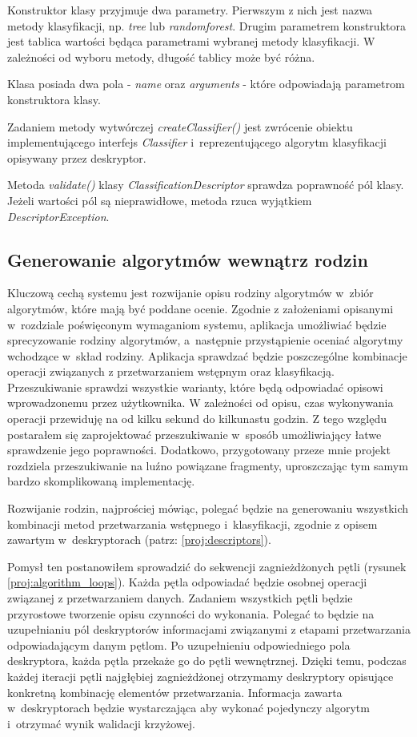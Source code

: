\documentclass[../thesis.tex]{subfiles}
\begin{document}
Konstruktor klasy przyjmuje dwa parametry. Pierwszym z nich jest nazwa metody klasyfikacji, np. \emph{tree} lub \emph{randomforest}. Drugim parametrem konstruktora jest tablica wartości będąca parametrami wybranej metody klasyfikacji. W zależności od wyboru metody, długość tablicy może być różna.

Klasa posiada dwa pola - \emph{name} oraz \emph{arguments} - które odpowiadają parametrom konstruktora klasy.

Zadaniem metody wytwórczej \emph{createClassifier()} jest zwrócenie obiektu implementującego interfejs \emph{Classifier} i~reprezentującego algorytm klasyfikacji opisywany przez deskryptor.

Metoda \emph{validate()} klasy \emph{ClassificationDescriptor} sprawdza poprawność pól klasy. Jeżeli wartości pól są nieprawidłowe, metoda rzuca wyjątkiem \emph{DescriptorException}.

\subsection{Generowanie algorytmów wewnątrz rodzin}

Kluczową cechą systemu jest rozwijanie opisu rodziny algorytmów w~zbiór algorytmów, które mają być poddane ocenie. Zgodnie z założeniami opisanymi w~rozdziale poświęconym wymaganiom systemu, aplikacja umożliwiać będzie sprecyzowanie rodziny algorytmów, a~następnie przystąpienie oceniać algorytmy wchodzące w~skład rodziny. Aplikacja sprawdzać będzie poszczególne kombinacje operacji związanych z przetwarzaniem wstępnym oraz klasyfikacją. Przeszukiwanie sprawdzi wszystkie warianty, które będą odpowiadać opisowi wprowadzonemu przez użytkownika. W zależności od opisu, czas wykonywania operacji przewiduję na od kilku sekund do kilkunastu godzin. Z tego względu postarałem się zaprojektować przeszukiwanie w~sposób umożliwiający łatwe sprawdzenie jego poprawności. Dodatkowo, przygotowany przeze mnie projekt rozdziela przeszukiwanie na luźno powiązane fragmenty, uproszczając tym samym bardzo skomplikowaną implementację.

Rozwijanie rodzin, najprościej mówiąc, polegać będzie na generowaniu wszystkich kombinacji metod przetwarzania wstępnego i~klasyfikacji, zgodnie z opisem zawartym w~deskryptorach (patrz: \ref{proj:descriptors}).

Pomysł ten postanowiłem sprowadzić do sekwencji zagnieżdżonych pętli (rysunek \ref{proj:algorithm_loops}). Każda pętla odpowiadać będzie osobnej operacji związanej z przetwarzaniem danych. Zadaniem wszystkich pętli będzie przyrostowe tworzenie opisu czynności do wykonania. Polegać to będzie na uzupełnianiu pól deskryptorów informacjami związanymi z etapami przetwarzania odpowiadającym danym pętlom. Po uzupełnieniu odpowiedniego pola deskryptora, każda pętla przekaże go do pętli wewnętrznej. Dzięki temu, podczas każdej iteracji pętli najgłębiej zagnieżdżonej otrzymamy deskryptory opisujące konkretną kombinację elementów przetwarzania. Informacja zawarta w~deskryptorach będzie wystarczająca aby wykonać pojedynczy algorytm i~otrzymać wynik walidacji krzyżowej. 
\end{document}
